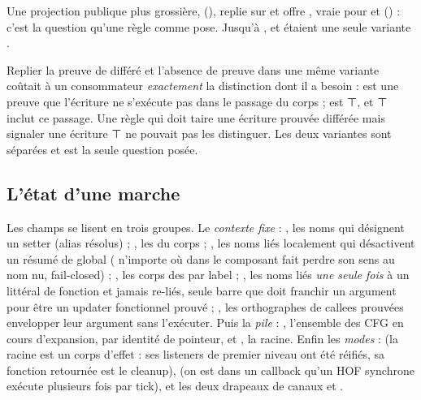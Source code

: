 Une projection publique plus grossière,  (), replie  sur  et offre , vraie pour  et  () : c'est la question qu'une règle comme  pose. Jusqu'à ,  et  étaient une seule variante .

\begin{decision}
Replier la preuve de différé et l'absence de preuve dans une même variante coûtait à un consommateur \emph{exactement} la distinction dont il a besoin :  est une preuve que l'écriture ne s'exécute pas dans le passage du corps ;  est ⊤, et ⊤ inclut ce passage. Une règle qui doit taire une écriture prouvée différée mais signaler une écriture ⊤ ne pouvait pas les distinguer. Les deux variantes sont séparées et  est la seule question posée.
\end{decision}

\subsection{L'état d'une marche}


Les champs se lisent en trois groupes. Le \emph{contexte fixe} : , les noms qui désignent un setter (alias résolus) ; , les  du corps ; , les noms liés localement qui désactivent un résumé de global ( n'importe où dans le composant fait perdre son sens au nom nu, fail-closed) ; , les corps des  par label ; , les noms liés \emph{une seule fois} à un littéral de fonction et jamais re-liés, seule barre que doit franchir un argument  pour être un updater fonctionnel prouvé ; , les orthographes de callees prouvées envelopper leur argument sans l'exécuter. Puis la \emph{pile} : , l'ensemble des CFG en cours d'expansion, par identité de pointeur, et , la racine. Enfin les \emph{modes} :  (la racine est un corps d'effet : ses listeners de premier niveau ont été réifiés, sa fonction retournée est le cleanup),  (on est dans un callback qu'un HOF synchrone exécute plusieurs fois par tick), et les deux drapeaux de canaux  et .


